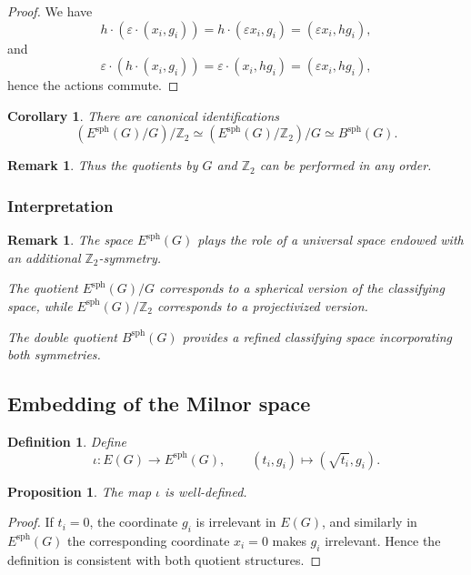 \documentclass[11pt]{amsart}
\newtheorem{corollary}[theorem]{Corollary}
\newtheorem{proposition}[theorem]{Proposition}
\newtheorem{definition}[theorem]{Definition}
\newtheorem{remark}[theorem]{Remark}
\begin{document}
\begin{proof}
We have
\[
h \cdot (\varepsilon \cdot (x_i,g_i))
= h \cdot (\varepsilon x_i, g_i)
= (\varepsilon x_i, hg_i),
\]
and
\[
\varepsilon \cdot (h \cdot (x_i,g_i))
= \varepsilon \cdot (x_i, hg_i)
= (\varepsilon x_i, hg_i),
\]
hence the actions commute.
\end{proof}

\begin{corollary}
There are canonical identifications
\[
(E^{\mathrm{sph}}(G)/G)/\mathbb{Z}_2
\simeq
(E^{\mathrm{sph}}(G)/\mathbb{Z}_2)/G
\simeq
B^{\mathrm{sph}}(G).
\]
\end{corollary}

\begin{remark}
Thus the quotients by $G$ and $\mathbb{Z}_2$ can be performed in any order.
\end{remark}

\subsubsection{Interpretation}

\begin{remark}
The space $E^{\mathrm{sph}}(G)$ plays the role of a universal space endowed with an additional $\mathbb{Z}_2$-symmetry.

The quotient $E^{\mathrm{sph}}(G)/G$ corresponds to a spherical version of the classifying space, while $E^{\mathrm{sph}}(G)/\mathbb{Z}_2$ corresponds to a projectivized version.

The double quotient $B^{\mathrm{sph}}(G)$ provides a refined classifying space incorporating both symmetries.
\end{remark}
\subsection{Embedding of the Milnor space}

\begin{definition}
Define
\[
\iota : E(G) \longrightarrow E^{\mathrm{sph}}(G),
\qquad
(t_i,g_i) \longmapsto (\sqrt{t_i},g_i).
\]
\end{definition}

\begin{proposition}
The map $\iota$ is well-defined.
\end{proposition}

\begin{proof}
If $t_i = 0$, the coordinate $g_i$ is irrelevant in $E(G)$, and similarly in $E^{\mathrm{sph}}(G)$ the corresponding coordinate $x_i=0$ makes $g_i$ irrelevant. Hence the definition is consistent with both quotient structures.
\end{proof}
\end{document}
